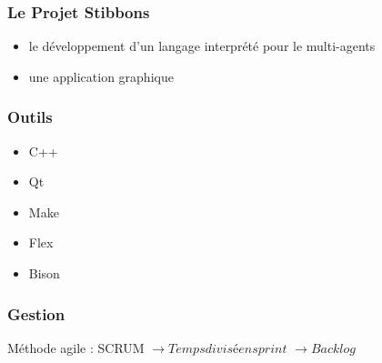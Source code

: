 \begin{frame}
\frametitle{Le Projet Stibbons}
\begin{itemize}
\item le développement d'un langage interprété pour le multi-agents
\item une application graphique 
\end{itemize}
\end{frame}

\begin{frame}
\frametitle{Outils}
\begin{itemize}
\item C++
\item Qt
\item Make
\item Flex 
\item Bison
\end{itemize}
\end{frame}

\begin{frame}
\frametitle{Gestion}
Méthode agile : SCRUM
$\rightarrow Temps divisé en sprint$ 
$\rightarrow Backlog$
\end{frame}
